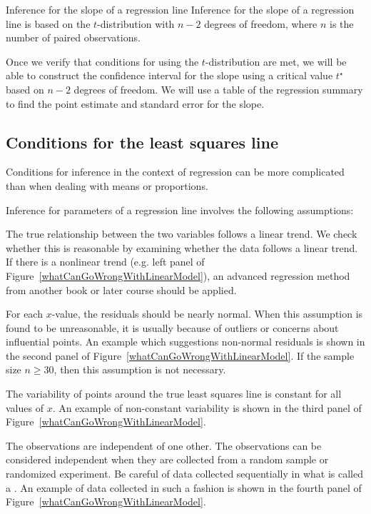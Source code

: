 \begin{onebox}
{Inference for the slope of a regression line}
Inference for the slope of a regression line is based on the $t$-distribution with $n-2$ degrees of freedom, where $n$ is the number of paired observations.
\end{onebox}

Once we verify that conditions for using the $t$-distribution are met, we will be able to construct the confidence interval for the slope using a critical value $t^{\star}$ based on $n-2$ degrees of freedom.  We will use a table of the regression summary to find the point estimate and standard error for the slope.


\subsection{Conditions for the least squares line}

Conditions for inference in the context of regression can be more complicated than when dealing with means or proportions.  

Inference for parameters of a regression line involves the following assumptions:
\begin{description}
\setlength{\itemsep}{0mm}
\item[Linearity.] The true relationship between the two variables follows a linear trend.  We check whether this is reasonable by examining whether the data follows a linear trend.  If there is a nonlinear trend (e.g. left panel of Figure~\ref{whatCanGoWrongWithLinearModel}), an advanced regression method from another book or later course should be applied.
\item[Nearly normal residuals.] For each $x$-value, the residuals should be nearly normal.
When this assumption is found to be unreasonable, it is usually because of outliers or concerns about influential points.  An example which suggestions non-normal residuals is shown in the second panel of Figure~\ref{whatCanGoWrongWithLinearModel}.  If the sample size $n\ge 30$, then this assumption is not necessary.
\item[Constant variability.] The variability of points around the true least squares line is constant for all values of $x$. An example of non-constant variability is shown in the third panel of Figure~\ref{whatCanGoWrongWithLinearModel}.
\item[Independent.] The observations are independent of one other.  The observations can be considered independent when they are collected from a random sample or randomized experiment.  Be careful of data collected sequentially in what is called a .  An example of data collected in such a fashion is shown in the fourth panel of Figure~\ref{whatCanGoWrongWithLinearModel}.
\end{description}

